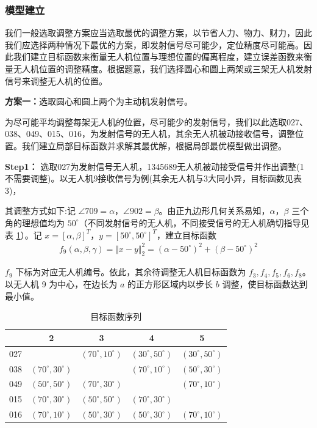 \documentclass[withoutpreface,bwprint]{cumcmthesis} %
\begin{document}
\subsubsection{模型建立}

我们一般选取调整方案应当选取最优的调整方案，以节省人力、物力、财力，因此我们应选择两种情况下最优的方案，即发射信号尽可能少，定位精度尽可能高。因此我们建立目标函数来衡量无人机位置与理想位置的偏离程度，建立误差函数来衡量无人机位置的调整精度。根据题意，我们选择圆心和圆上两架或三架无人机发射信号来调整无人机的位置。

\noindent \textbf{方案一：}选取圆心和圆上两个为主动机发射信号。
    
        为尽可能平均调整每架无人机的位置，尽可能少的发射信号，我们以此选取027、038、049、015、016，为发射信号的无人机，其余无人机被动接收信号，调整位置。我们建立局部目标函数并求解其最优解，根据局部最优模型做出调整。

        \textbf{Step1：} 选取027为发射信号无人机，1345689无人机被动接受信号并作出调整(1不需要调整)。以无人机9接收信号为例(其余无人机与3大同小异，目标函数见表3)，
     
        其调整方式如下:记 $\angle 709 = \alpha$，$\angle 902 = \beta$。由正九边形几何关系易知，$\alpha$，$\beta$ 三个角的理想值均为 $50^\circ$（不同发射信号的无人机，不同接受信号的无人机确切指导见表 \ref{表3}）。记 $x = [\alpha, \beta]^T$，$y = [50^\circ, 50^\circ]^T$，建立目标函数
\begin{align}
    f_9(\alpha, \beta, \gamma) = \Vert{x} - {y}\Vert_2^2 = (\alpha - 50^\circ)^2 + (\beta - 50^\circ)^2
\end{align}

$f_9$ 下标为对应无人机编号。依此，其余待调整无人机目标函数为 $f_3, f_4, f_5, f_6, f_8$。以无人机 9 为中心，在边长为 $a$ 的正方形区域内以步长 $b$ 调整，使目标函数达到最小值。


\begin{table}[htbp]
  \centering
  \caption{目标函数序列}
  \label{表3}
  \begin{tabular}{ccccc}
    \toprule
    & 2 & 3 & 4 & 5 \\
    \midrule
    027 &  & $(70^\circ, 10^\circ)$ & $(30^\circ, 50^\circ)$ & $(30^\circ, 50^\circ)$ \\
    038 & $(70^\circ, 30^\circ)$ &  & $(70^\circ, 10^\circ)$ & $(50^\circ, 30^\circ)$ \\
    049 & $(50^\circ, 50^\circ)$ & $(70^\circ, 30^\circ)$ &  & $(70^\circ, 10^\circ)$ \\
    015 & $(70^\circ, 30^\circ)$ & $(50^\circ, 50^\circ)$ & $(70^\circ, 30^\circ)$ &  \\
    016 & $(70^\circ, 10^\circ)$ & $(50^\circ, 30^\circ)$ & $(50^\circ, 30^\circ)$ & $(70^\circ, 10^\circ)$ \\
    \bottomrule
  \end{tabular}
\end{table}
\end{document}

